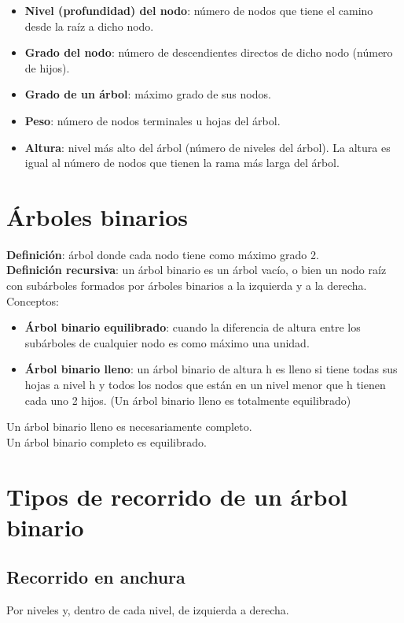 \documentclass{article}
\begin{document}
\begin{itemize}
    \item \textbf{Nivel (profundidad) del nodo}: número de nodos que tiene el camino desde la raíz a dicho nodo.

    \item \textbf{Grado del nodo}: número de descendientes directos de dicho nodo (número de hijos).

    \item \textbf{Grado de un árbol}: máximo grado de sus nodos.

    \item \textbf{Peso}: número de nodos terminales u hojas del árbol.

    \item \textbf{Altura}: nivel más alto del árbol (número de niveles del árbol). La altura es igual al número de nodos que tienen la rama más larga del árbol.
\end{itemize}

\section{Árboles binarios}
\textbf{Definición}: árbol donde cada nodo tiene como máximo grado 2. \\
\textbf{Definición recursiva}: un árbol binario es un árbol vacío, o bien un nodo raíz con subárboles formados por árboles binarios a la izquierda y a la derecha. \\

Conceptos:
\begin{itemize}
    \item \textbf{Árbol binario equilibrado}: cuando la diferencia de altura entre los subárboles de cualquier nodo es como máximo una unidad.

    \item \textbf{Árbol binario lleno}: un árbol binario de altura h es lleno si tiene todas sus hojas a nivel h y todos los nodos que están en un nivel menor que h tienen cada uno 2 hijos. (Un árbol binario lleno es totalmente equilibrado)
\end{itemize}

Un árbol binario lleno es necesariamente completo. \\
Un árbol binario completo es equilibrado.

\section{Tipos de recorrido de un árbol binario}
\subsection{Recorrido en anchura}
Por niveles y, dentro de cada nivel, de izquierda a derecha.
\end{document}
